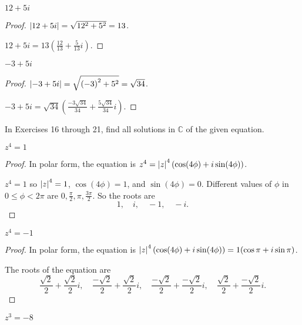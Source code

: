 \begin{exercise}
    $12 + 5i$
\end{exercise}

\begin{proof}
    $\left\vert{12 + 5i}\right\vert = \sqrt{12^{2} + 5^{2}} = 13$.

    $12 + 5i = 13\left( \frac{12}{13} + \frac{5}{13}i \right)$.
\end{proof}

\begin{exercise}
    $-3 + 5i$
\end{exercise}

\begin{proof}
    $\left\vert{-3 + 5i}\right\vert = \sqrt{{(-3)}^{2} + 5^{2}} = \sqrt{34}$.

    $-3 + 5i = \sqrt{34}\left( \frac{-3\sqrt{34}}{34} + \frac{5\sqrt{34}}{34}i \right)$.
\end{proof}

In Exercises 16 through 21, find all solutions in $\mathbb{C}$ of the given equation.

\begin{exercise}
    $z^{4} = 1$
\end{exercise}

\begin{proof}
    In polar form, the equation is $z^{4} = \left\vert{z}\right\vert^{4}(\cos (4\phi) + i\sin (4\phi))$.

    $z^{4} = 1$ so $\left\vert{z}\right\vert^{4} = 1$, $\cos(4\phi) = 1$, and $\sin(4\phi) = 0$. Different values of $\phi$ in $0\le \phi < 2\pi$ are $0, \frac{\pi}{2}, \pi, \frac{3\pi}{2}$. So the roots are
    \[
        1,\quad i,\quad -1,\quad -i.
    \]
\end{proof}

\begin{exercise}
    $z^{4} = -1$
\end{exercise}

\begin{proof}
    In polar form, the equation is $\left\vert{z}\right\vert^{4}(\cos (4\phi) + i\sin (4\phi)) = 1(\cos\pi + i\sin\pi)$.

    The roots of the equation are
    \[
        \frac{\sqrt{2}}{2} + \frac{\sqrt{2}}{2}i,\quad \frac{-\sqrt{2}}{2} + \frac{\sqrt{2}}{2}i,\quad \frac{-\sqrt{2}}{2} + \frac{-\sqrt{2}}{2}i,\quad \frac{\sqrt{2}}{2} + \frac{-\sqrt{2}}{2}i.
    \]
\end{proof}

\begin{exercise}
    $z^{3} = -8$
\end{exercise}

